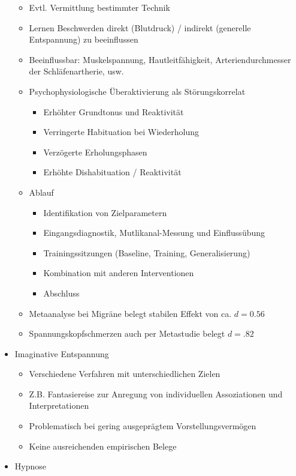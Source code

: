 \documentclass[11pt, paper=a4, twocolumn]{scrartcl}
\begin{document}
\begin{itemize}
\begin{itemize}
					\item Evtl. Vermittlung bestimmter Technik
					\item Lernen Beschwerden direkt (Blutdruck) / indirekt (generelle Entspannung) zu beeinflussen
					\item Beeinflussbar: Muskelspannung, Hautleitfähigkeit, Arteriendurchmesser der Schläfenartherie, usw.
					\item Psychophysiologische Überaktivierung als Störungskorrelat
						\begin{itemize}
							\item Erhöhter Grundtonus und Reaktivität
							\item Verringerte Habituation bei Wiederholung
							\item Verzögerte Erholungsphasen
							\item Erhöhte Dishabituation / Reaktivität
						\end{itemize}
					\item Ablauf
						\begin{itemize}
							\item Identifikation von Zielparametern
							\item Eingangsdiagnostik, Mutlikanal-Messung und Einflussübung
							\item Trainingssitzungen (Baseline, Training, Generalisierung)
							\item Kombination mit anderen Interventionen
							\item Abschluss
						\end{itemize}
					\item Metaanalyse bei Migräne belegt stabilen Effekt von ca. $d=0.56$
					\item Spannungskopfschmerzen auch per Metastudie belegt $d=.82$
				\end{itemize}
			\item Imaginative Entspannung
				\begin{itemize}
					\item Verschiedene Verfahren mit unterschiedlichen Zielen
					\item Z.B. Fantasiereise zur Anregung von individuellen Assoziationen und Interpretationen
					\item Problematisch bei gering ausgeprägtem Vorstellungsvermögen
					\item Keine ausreichenden empirischen Belege
				\end{itemize}
			\item Hypnose
				\begin{itemize}

\end{itemize}
\end{itemize}
\end{document}
